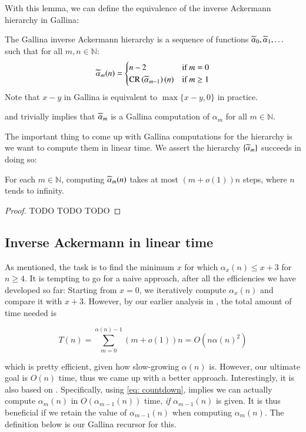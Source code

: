 With this lemma, we can define the equivalence of the inverse Ackermann hierarchy in Gallina:

\begin{defn}
The Gallina inverse Ackermann hierarchy is a sequence of functions $\widetilde{\alpha}_0, \widetilde{\alpha}_1, \ldots $ such that for all $m, n\in \mathbb{N}$:
\begin{equation}
\widetilde{\alpha}_m(n) = \begin{cases}
n - 2 & \text{if } m = 0 \\ \text{CR}\left(\widetilde{\alpha}_{m-1}\right)(n) & \text{if } m \ge 1
\end{cases}
\end{equation}
Note that $x-y$ in Gallina is equivalent to $\max\{x-y, 0\}$ in practice.
\end{defn}

 and  trivially implies that $\widetilde{\alpha}_m$ is a Gallina computation of $\alpha_m$ for all $m\in \mathbb{N}$.

The important thing to come up with Gallina computations for the hierarchy is we want to compute them in linear time. We assert the hierarchy $\left\{\widetilde{\alpha}_m\right\}$ succeeds in doing so:

\begin{thm}  \label{thm: inv_ack_hier linear}
For each $m \in \mathbb{N}$, computing $\widetilde{\alpha}_m(n)$ takes at most $(m + o(1))n$ steps, where $n$ tends to infinity.
\end{thm}

\begin{proof}
TODO TODO TODO
\end{proof}

\subsection{Inverse Ackermann in linear time}  \label{subsec: inv_ack linear}

As mentioned, the task is to find the minimum $x$ for which $\alpha_x(n) \le x + 3$ for $n\ge 4$. It is tempting to go for a naive approach, after all the efficiencies we have developed so far: Starting from $x=0$, we iteratively compute $\alpha_x(n)$ and compare it with $x+3$. However, by our earlier analysis in , the total amount of time needed is

$$ T(n) = \sum_{m = 0}^{\alpha(n)-1}(m + o(1))n = O\left(n\alpha(n)^2\right) $$

which is pretty efficient, given how slow-growing $\alpha(n)$ is. However, our ultimate goal is $O(n)$ time, thus we came up with a better approach. Interestingly, it is also based on . Specifically, using \eqref{eq: countdown},  implies we can actually compute $\alpha_m(n)$ in $O(\alpha_{m-1}(n))$ time, \textit{if} $\alpha_{m-1}(n)$ is given. It is thus beneficial if we retain the value of $\alpha_{m-1}(n)$ when computing $\alpha_m(n)$. The definition below is our Gallina recursor for this.

